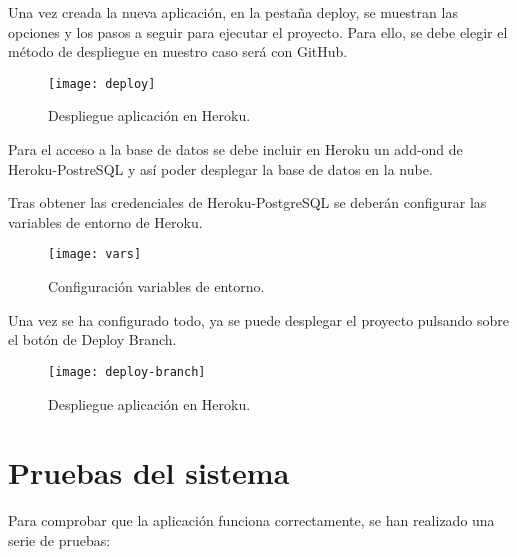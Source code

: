 Una vez creada la nueva aplicación, en la pestaña deploy, se muestran las opciones y los pasos a seguir para ejecutar el proyecto. Para ello, se debe elegir el método de despliegue en nuestro caso será con GitHub.
\newpage
    \begin{figure}[htbp]
    \centering
    \texttt{[image: deploy]}
    \caption{Despliegue aplicación en Heroku.}
    \label{fig:deploy}
    \end{figure}


Para el acceso a la base de datos se debe incluir en Heroku un add-ond de Heroku-PostreSQL y así poder desplegar la base de datos en la nube. 

Tras obtener las credenciales de Heroku-PostgreSQL se deberán configurar las variables de entorno de Heroku.
    \begin{figure}[htbp]
    \centering
    \texttt{[image: vars]}
    \caption{Configuración variables de entorno.}
    \label{fig:vars}
    \end{figure}

Una vez se ha configurado todo, ya se puede desplegar el
proyecto pulsando sobre el botón de Deploy Branch.
    \begin{figure}[htbp]
    \centering
    \texttt{[image: deploy-branch]}
    \caption{Despliegue aplicación en Heroku.}
    \label{fig:deploy-branch}
    \end{figure}
    
\section{Pruebas del sistema}

Para comprobar que la aplicación funciona correctamente, se han realizado una serie de pruebas:


